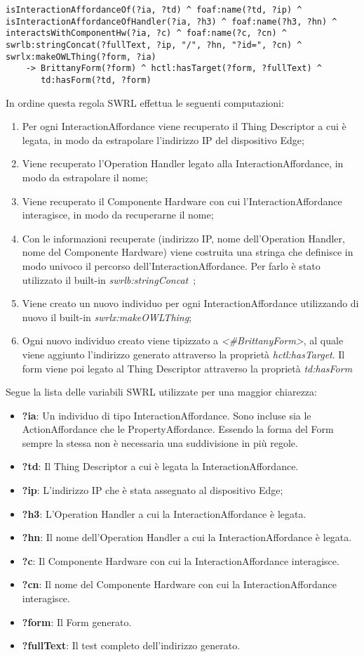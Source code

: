 \begin{verbatim}
isInteractionAffordanceOf(?ia, ?td) ^ foaf:name(?td, ?ip) ^
isInteractionAffordanceOfHandler(?ia, ?h3) ^ foaf:name(?h3, ?hn) ^
interactsWithComponentHw(?ia, ?c) ^ foaf:name(?c, ?cn) ^
swrlb:stringConcat(?fullText, ?ip, "/", ?hn, "?id=", ?cn) ^
swrlx:makeOWLThing(?form, ?ia)
	-> BrittanyForm(?form) ^ hctl:hasTarget(?form, ?fullText) ^
	   td:hasForm(?td, ?form)
\end{verbatim}
In ordine questa regola SWRL effettua le seguenti computazioni:
\begin{enumerate}
	\item Per ogni InteractionAffordance viene recuperato il Thing Descriptor a cui è legata, in modo da estrapolare l'indirizzo IP del dispositivo Edge;
	\item Viene recuperato l'Operation Handler legato alla InteractionAffordance, in modo da estrapolare il nome;
	\item Viene recuperato il Componente Hardware con cui l'InteractionAffordance interagisce, in modo da recuperarne il nome;
	\item Con le informazioni recuperate (indirizzo IP, nome dell'Operation Handler, nome del Componente Hardware) viene costruita una stringa che definisce in modo univoco il percorso dell'InteractionAffordance. Per farlo è stato utilizzato il built-in \textit{swrlb:stringConcat}~\cite{BuiltIns80:online};
	\item Viene creato un nuovo individuo per ogni InteractionAffordance utilizzando di nuovo il built-in \textit{swrlx:makeOWLThing};
	\item Ogni nuovo individuo creato viene tipizzato a \textit{<\#BrittanyForm>}, al quale viene aggiunto l'indirizzo generato attraverso la proprietà \textit{hctl:hasTarget}. Il form viene poi legato al Thing Descriptor attraverso la proprietà \textit{td:hasForm}
\end{enumerate}
Segue la lista delle variabili SWRL utilizzate per una maggior chiarezza:
\begin{itemize}
	\item \textbf{?ia}: Un individuo di tipo InteractionAffordance. Sono incluse sia le ActionAffordance che le PropertyAffordance. Essendo la forma del Form sempre la stessa non è necessaria una suddivisione in più regole.
	\item \textbf{?td}: Il Thing Descriptor a cui è legata la InteractionAffordance.
	\item \textbf{?ip}: L'indirizzo IP che è stata assegnato al dispositivo Edge;
	\item \textbf{?h3}: L'Operation Handler a cui la InteractionAffordance è legata.
	\item \textbf{?hn}: Il nome dell'Operation Handler a cui la InteractionAffordance è legata.
	\item \textbf{?c}: Il Componente Hardware con cui la InteractionAffordance interagisce.
	\item \textbf{?cn}: Il nome del Componente Hardware con cui la InteractionAffordance interagisce.
	\item \textbf{?form}: Il Form generato.
	\item \textbf{?fullText}: Il test completo dell'indirizzo generato.
\end{itemize}
